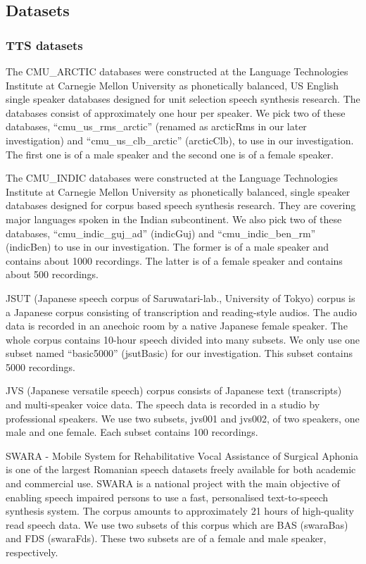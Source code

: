 \documentclass[12pt]{article}
\begin{document}
\subsection{Datasets}

\subsubsection{TTS datasets}
The CMU\_ARCTIC databases \cite{cmrArctic} were constructed at the Language Technologies Institute at Carnegie Mellon University as phonetically balanced, US English single speaker databases designed for unit selection speech synthesis research. The databases consist of approximately one hour per speaker. We pick two of these databases, “cmu\_us\_rms\_arctic” (renamed as arcticRms in our later investigation) and “cmu\_us\_clb\_arctic” (arcticClb), to use in our investigation. The first one is of a male speaker and the second one is of a female speaker.

The CMU\_INDIC databases \cite{cmuIndic} were constructed at the Language Technologies Institute at Carnegie Mellon University as phonetically balanced, single speaker databases designed for corpus based speech synthesis research. They are covering major languages spoken in the Indian subcontinent. We also pick two of these databases, “cmu\_indic\_guj\_ad” (indicGuj) and “cmu\_indic\_ben\_rm” (indicBen) to use in our investigation. The former is of a male speaker and contains about 1000 recordings. The latter is of a female speaker and contains about 500 recordings.

JSUT (Japanese speech corpus of Saruwatari-lab., University of Tokyo) corpus \cite{jsut} is a Japanese corpus consisting of transcription and reading-style audios. The audio data is recorded in an anechoic room by a native Japanese female speaker. The whole corpus contains 10-hour speech divided into many subsets. We only use one subset named “basic5000” (jsutBasic) for our investigation. This subset contains 5000 recordings.

JVS (Japanese versatile speech) corpus \cite{jvs} consists of Japanese text (transcripts) and multi-speaker voice data. The speech data is recorded in a studio by professional speakers. We use two subsets, jvs001 and jvs002, of two speakers, one male and one female. Each subset contains 100 recordings.

SWARA - Mobile System for Rehabilitative Vocal Assistance of Surgical Aphonia \cite{swara} is one of the largest Romanian speech datasets freely available for both academic and commercial use. SWARA is a national project with the main objective of enabling speech impaired persons to use a fast, personalised text-to-speech synthesis system. The corpus amounts to approximately 21 hours of high-quality read speech data. We use two subsets of this corpus which are BAS (swaraBas) and FDS (swaraFds). These two subsets are of a female and male speaker, respectively.
\end{document}
